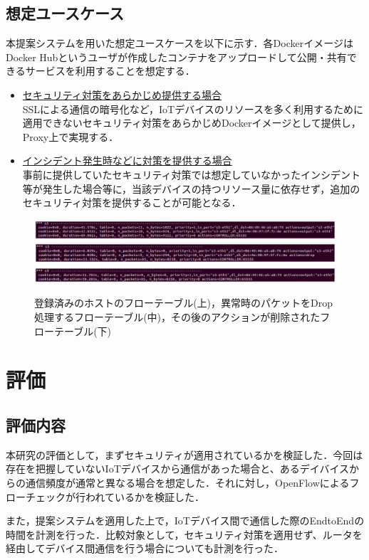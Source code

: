 \documentclass[Japanese]{dicomopapers}
\begin{document}
\subsection{想定ユースケース}
本提案システムを用いた想定ユースケースを以下に示す．各DockerイメージはDocker Hubというユーザが作成したコンテナをアップロードして公開・共有できるサービスを利用することを想定する．

\begin{itemize}
	\item \underline{セキュリティ対策をあらかじめ提供する場合}\mbox{}\\
	      SSLによる通信の暗号化など，IoTデバイスのリソースを多く利用するために適用できないセキュリティ対策をあらかじめDockerイメージとして提供し，Proxy上で実現する．
	\item \underline{インシデント発生時などに対策を提供する場合}\mbox{}\\
	      事前に提供していたセキュリティ対策では想定していなかったインシデント等が発生した場合等に，当該デバイスの持つリソース量に依存せず，追加のセキュリティ対策を提供することが可能となる．
\end{itemize}

\begin{figure}[!tb]
	\centering
	\includegraphics[width=\linewidth]{img/result_flow4v2.eps}
	\includegraphics[width=\linewidth]{img/result_flow2v2.eps}
	\includegraphics[width=\linewidth]{img/result_flow3v2.eps}
	\caption{登録済みのホストのフローテーブル(上)，異常時のパケットをDrop処理するフローテーブル(中)，その後のアクションが削除されたフローテーブル(下)}
	\label{fig:result1}
\end{figure}

\section{評価}
\subsection{評価内容}
本研究の評価として，まずセキュリティが適用されているかを検証した．今回は存在を把握していないIoTデバイスから通信があった場合と、あるデイバイスからの通信頻度が通常と異なる場合を想定した．それに対し，OpenFlowによるフローチェックが行われているかを検証した．\par
また，提案システムを適用した上で，IoTデバイス間で通信した際のEndtoEndの時間を計測を行った．比較対象として，セキュリティ対策を適用せず、ルータを経由してデバイス間通信を行う場合についても計測を行った．
\end{document}
